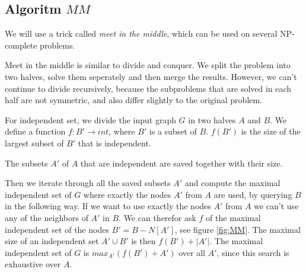 \documentclass{tufte-handout}
\begin{document}
\subsection{Algoritm $MM$}
We will use a trick called \emph{meet in the middle}, which can be used on several NP-complete problems.

\bigskip

Meet in the middle is similar to divide and conquer. We split the problem into two halves, solve them seperately and then merge the results.
However, we can't continue to divide recursively, because the subproblems that are solved in each half are not symmetric, 
and also differ slightly to the original problem.

\bigskip


For independent set, we divide the input graph $G$ in two halves $A$ and $B$.
We define a function $f: B' \rightarrow int$, where $B'$ is a subset of $B$. 
$f(B')$ is the size of the largest subset of $B'$ that is independent.

\bigskip

The subsets $A'$ of $A$ that are independent are saved together with their size.

Then we iterate through all the saved subsets $A'$ and compute 
the maximal independent set of $G$ where exactly the nodes $A'$ from $A$ are used, by querying $B$ in the following way.
If we want to use exactly the nodes $A'$ from $A$ we can't use any of the neighbors of $A'$ in $B$. 
We can therefor ask $f$ of the maximal independent set of the nodes $B' = B - N[A']$, see figure \ref{fig:MM}. 
The maximal size of an independent set $A' \cup B'$ is then $f(B') + |A'|$.
The maximal independent set of $G$ is $max_{A'}(f(B') + A')$ over all $A'$,
since this search is exhaustive over $A$.
\end{document}
